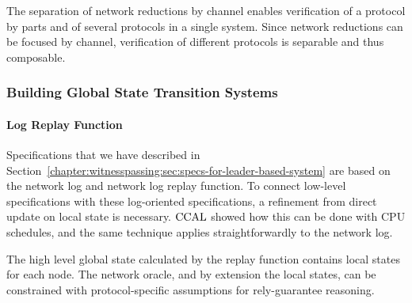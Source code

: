 The separation of network reductions by channel enables verification of a
protocol by parts and of several protocols in a single system. Since network
reductions can be focused by channel, verification of different protocols is
separable and thus composable.


\subsubsection{Building Global State Transition Systems}

\paragraph{Log Replay Function}
Specifications that we have described in
 Section~\ref{chapter:witnesspassing:sec:specs-for-leader-based-system}
 are based on the network log and network
log replay function. To connect low-level specifications with these log-oriented
specifications, a refinement from direct update on local state is necessary. 
 $\mathrm{CCAL}$  showed how this can
be done with CPU schedules, and the same technique applies straightforwardly to
the network log.

The high level global state calculated by the replay function contains local
states for each node. The network oracle, and by extension the local states, can
be constrained with protocol-specific assumptions for rely-guarantee reasoning.
